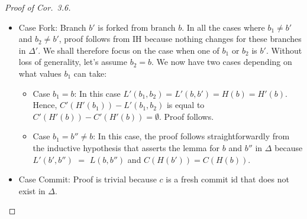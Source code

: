 \begin{proof}[Proof of Cor.~3.6]
\begin{itemize}
\begin{itemize}
        \item $C'(H'(b)) = C(H(b'))$ in the conclusion of {\sc
          FastFwd} whereas it is equal to $C(H(b)) \cup C(H(b'))$ in
          {\sc Merge}. However since $C(H(b)) = C(L(b,b')) \subset
          C(H(b'))$ in the premise of {\sc FastFwd}, $C'(H'(b))$ in
          the conclusion is indeed equal to $C(H(b)) \cup C(H(b'))$
          like in {\sc Merge}.
      \end{itemize}
      Consequently, we can reuse the proof of {\sc Merge} as a proof
      of {\sc FastFwd}.

    \item Case {\sc Fork}: Branch $b'$ is forked from branch $b$. In
      all the cases where $b_1 \neq b'$ and $b_2 \neq b'$, proof
      follows from IH because nothing changes for these branches in
      $\Delta'$. We shall therefore focus on the case when one of
      $b_1$ or $b_2$ is $b'$. Without loss of generality, let's assume
      $b_2 = b$. We now have two cases depending on what values $b_1$
      can take:
      \begin{itemize}
        \item Case $b_1 = b$: In this case $L'(b_1,b_2) = L'(b,b') =
          H(b) = H'(b)$. Hence, $C'(H'(b_1)) - L'(b_1,b_2)$ is equal
          to $C'(H'(b)) - C'(H'(b)) = \emptyset$. Proof follows.

        \item Case $b_1 = b'' \neq b$: In this case, the proof follows
          straightforwardly from the inductive hypothesis that asserts
          the lemma for $b$ and $b''$ in $\Delta$ because $L'(b',b'')$
          $=$ $L(b,b'')$ and $C(H(b')) = C(H(b))$.
      \end{itemize}

    \item Case {\sc Commit}: Proof is trivial because $c$ is a fresh
      commit id that does not exist in $\Delta$.

  \end{itemize}
\end{proof}

